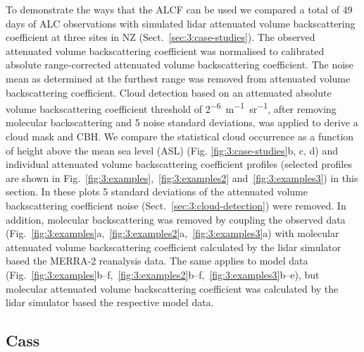 To demonstrate the ways that the ALCF can be used we compared a total of 49 days of ALC observations with simulated lidar
attenuated volume backscattering coefficient at three sites in NZ (Sect.~\ref{sec:3:case-studies}).
The observed attenuated volume backscattering coefficient was normalised to calibrated absolute range-corrected attenuated volume backscattering coefficient. The noise mean as determined at the
furthest range was removed from attenuated volume backscattering coefficient. Cloud detection based on an
attenuated absolute volume backscattering coefficient threshold of 2\unit{^{-6} m^{-1}sr^{-1}},
after removing molecular backscattering and 5 noise standard deviations, was applied
to derive a cloud mask and CBH. We compare the statistical cloud occurrence
as a function of height above the mean sea level (ASL) (Fig.
\ref{fig:3:case-studies}b, c, d) and individual attenuated volume backscattering coefficient profiles (selected
profiles are shown in Fig.~\ref{fig:3:examples},~\ref{fig:3:examples2} and~\ref{fig:3:examples3}) in this section.
In these plots 5 standard deviations of the attenuated volume backscattering
coefficient noise  (Sect.~\ref{sec:3:cloud-detection}) were removed. In addition,
molecular backscattering was removed by coupling the observed
data (Fig.~\ref{fig:3:examples}a,~\ref{fig:3:examples2}a,~\ref{fig:3:examples3}a)
with molecular attenuated volume backscattering coefficient calculated
by the lidar simulator based the MERRA-2 reanalysis data. The same applies
to model data (Fig.~\ref{fig:3:examples}b--f,~\ref{fig:3:examples2}b--f,~\ref{fig:3:examples3}b--e),
but molecular attenuated volume backscattering coefficient was
calculated by the lidar simulator based the respective model data.

\subsection{Cass}

